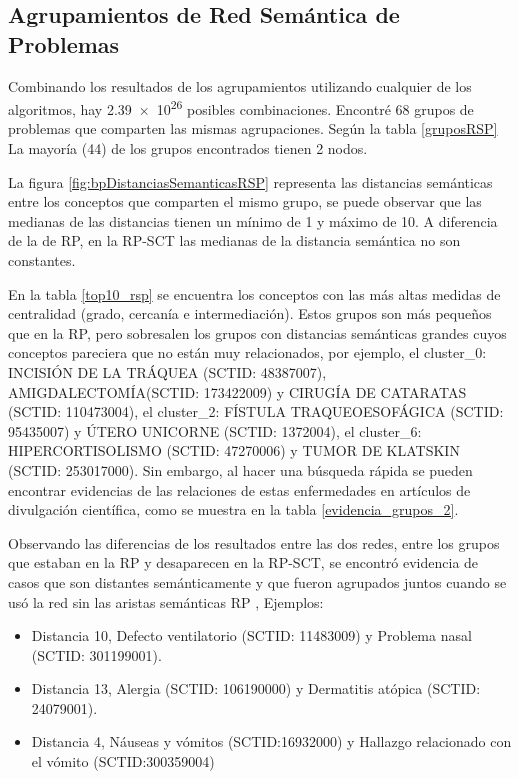 \subsection{Agrupamientos de Red Semántica de Problemas}
Combinando los resultados de los agrupamientos utilizando cualquier de los algoritmos, hay \num{2,39e26} posibles combinaciones. Encontré 68 grupos de problemas que comparten las mismas agrupaciones. Según la tabla \ref{gruposRSP} La mayoría (44) de los grupos encontrados tienen 2 nodos.

La figura \ref{fig:bpDistanciasSemanticasRSP} representa las distancias semánticas entre los conceptos que comparten el mismo grupo, se puede observar que las medianas de las distancias tienen un mínimo de 1 y máximo de 10. A diferencia de la de \acrshort{RP},  en la \acrshort{RP-SCT} las medianas de la distancia semántica no son constantes. 

En la tabla \ref{top10_rsp} se encuentra los conceptos con las más altas medidas de  centralidad (grado, cercanía e intermediación). Estos grupos son más pequeños que en la \acrshort{RP}, pero sobresalen los grupos con distancias semánticas grandes cuyos conceptos pareciera que no están muy relacionados, por ejemplo, el cluster\_0: INCISIÓN DE LA TRÁQUEA (SCTID: 48387007), AMIGDALECTOMÍA(SCTID: 173422009) y CIRUGÍA DE CATARATAS (SCTID: 110473004), el cluster\_2: FÍSTULA TRAQUEOESOFÁGICA (SCTID: 95435007) y ÚTERO UNICORNE (SCTID: 1372004), el cluster\_6: HIPERCORTISOLISMO (SCTID: 47270006) y TUMOR DE KLATSKIN (SCTID: 253017000). Sin embargo, al hacer una búsqueda rápida se pueden encontrar evidencias de las relaciones de estas enfermedades en artículos de divulgación científica, como se muestra en la tabla \ref{evidencia_grupos_2}.

Observando las diferencias de los resultados entre las dos redes, entre los grupos que estaban en la \acrshort{RP} y desaparecen en la \acrshort{RP-SCT},  se encontró evidencia de casos que son distantes semánticamente y que fueron agrupados juntos cuando se usó la red sin las aristas semánticas  \acrshort{RP} , Ejemplos:
\begin{itemize}
\item Distancia 10, Defecto ventilatorio (SCTID: 11483009) y Problema nasal  (SCTID: 301199001).
\item Distancia 13, Alergia (SCTID: 106190000)  y Dermatitis atópica (SCTID: 24079001).
\item Distancia 4, Náuseas y vómitos (SCTID:16932000)  y Hallazgo relacionado con el vómito (SCTID:300359004)
\end{itemize}

